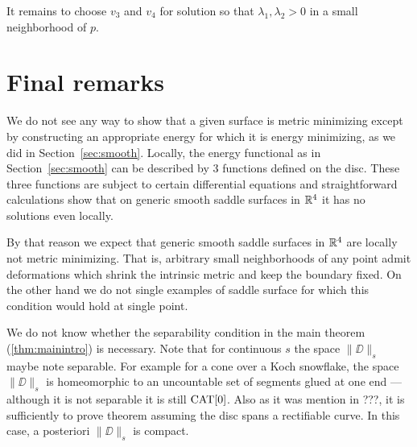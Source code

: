 \documentclass{article}
\begin{document}
It remains to choose $v_3$ and $v_4$ for solution so that $\lambda_1, \lambda_2>0$ in a small neighborhood of $p$.
\qeds


\section{Final remarks}\label{Final remarks}

We do not see any way to show that a given surface is metric minimizing except by constructing an appropriate energy for which it is energy minimizing, as we did in Section~\ref{sec:smooth}.
Locally, the energy functional as in Section~\ref{sec:smooth} can be described by 3 functions defined on the disc.
These three functions are subject to certain differential equations and 
straightforward calculations show that on generic smooth saddle surfaces in $\mathbb{R}^4$ 
it has no solutions even locally.

By that reason we expect that generic smooth saddle surfaces in $\mathbb{R}^4$ are locally not metric minimizing. 
That is, arbitrary small neighborhoods of any point admit deformations which shrink 
the intrinsic metric and keep the boundary fixed.
On the other hand we do not single examples of saddle surface for which this condition would hold at single point.

We do not know whether the separability condition in the main theorem (\ref{thm:mainintro}) is necessary.
Note that for continuous $s$ the space $\|\DD\|_s$ maybe note separable.
For example for a cone over a Koch snowflake, the space $\|\DD\|_s$ is homeomorphic to an uncountable set of segments glued at one end --- although it is not separable it is still $\mathop{\rm CAT}\nolimits[0]$.
Also as it was mention in ???, 
it is sufficiently to prove theorem assuming the disc spans a rectifiable curve.
In this case, a posteriori $\|\DD\|_s$ is compact.
\end{document}
